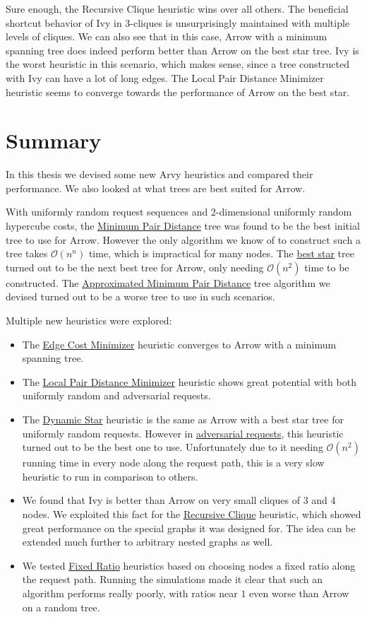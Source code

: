 \documentclass[a4paper, oneside]{discothesis}
\begin{document}
Sure enough, the Recursive Clique heuristic wins over all others. The beneficial shortcut behavior of Ivy in 3-cliques is unsurprisingly maintained with multiple levels of cliques. We can also see that in this case, Arrow with a minimum spanning tree does indeed perform better than Arrow on the best star tree. Ivy is the worst heuristic in this scenario, which makes sense, since a tree constructed with Ivy can have a lot of long edges. The Local Pair Distance Minimizer heuristic seems to converge towards the performance of Arrow on the best star.

\chapter{Summary}

In this thesis we devised some new Arvy heuristics and compared their performance. We also looked at what trees are best suited for Arrow.

With uniformly random request sequences and 2-dimensional uniformly random hypercube costs, the \hyperref[tree:mpd]{Minimum Pair Distance} tree was found to be the best initial tree to use for Arrow. However the only algorithm we know of to construct such a tree takes $\mathcal{O}(n^n)$ time, which is impractical for many nodes. The \hyperref[tree:star]{best star} tree turned out to be the next best tree for Arrow, only needing $\mathcal{O}(n^2)$ time to be constructed. The \hyperref[tree:ampd]{Approximated Minimum Pair Distance} tree algorithm we devised turned out to be a worse tree to use in such scenarios.

Multiple new heuristics were explored:
\begin{itemize}
\item The \hyperref[alg:ecm]{Edge Cost Minimizer} heuristic converges to Arrow with a minimum spanning tree.
\item The \hyperref[alg:lpm]{Local Pair Distance Minimizer} heuristic shows great potential with both uniformly random and adversarial requests.
\item The \hyperref[alg:dynstar]{Dynamic Star} heuristic is the same as Arrow with a best star tree for uniformly random requests. However in \hyperref[req:adversary]{adversarial requests}, this heuristic turned out to be the best one to use. Unfortunately due to it needing $\mathcal{O}(n^2)$ running time in every node along the request path, this is a very slow heuristic to run in comparison to others.
\item We found that Ivy is better than Arrow on very small cliques of 3 and 4 nodes. We exploited this fact for the \hyperref[alg:reclique]{Recursive Clique} heuristic, which showed great performance on the special graphs it was designed for. The idea can be extended much further to arbitrary nested graphs as well.
\item We tested \hyperref[alg:fr]{Fixed Ratio} heuristics based on choosing nodes a fixed ratio along the request path. Running the simulations made it clear that such an algorithm performs really poorly, with ratios near $1$ even worse than Arrow on a random tree.
\end{itemize}
\end{document}

